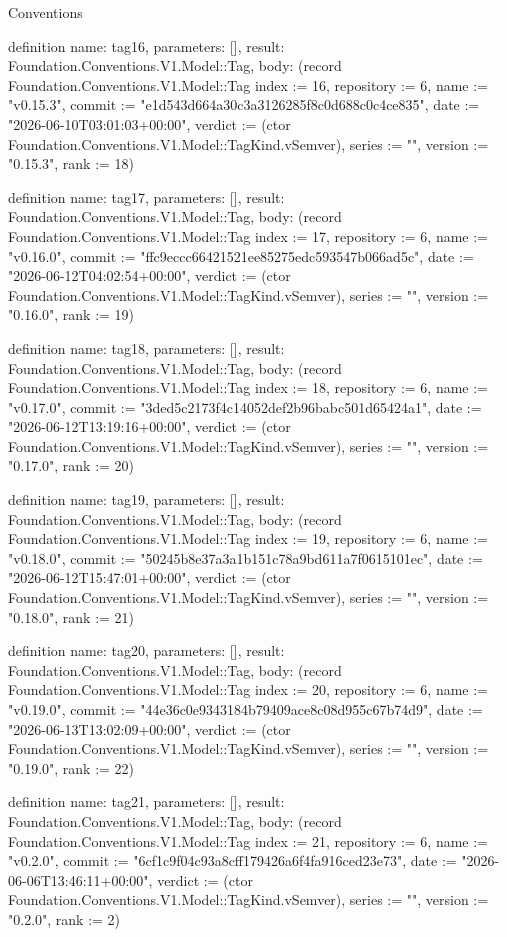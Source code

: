 \begin{lexlean}{Conventions}
\begin{semanticmodule}
definition{
  name: tag16,
  parameters: [],
  result: Foundation.Conventions.V1.Model::Tag,
  body: (record Foundation.Conventions.V1.Model::Tag {index := 16, repository := 6, name := "v0.15.3", commit := "e1d543d664a30c3a3126285f8c0d688c0c4ce835", date := "2026-06-10T03:01:03+00:00", verdict := (ctor Foundation.Conventions.V1.Model::TagKind.vSemver), series := "", version := "0.15.3", rank := 18})
}

definition{
  name: tag17,
  parameters: [],
  result: Foundation.Conventions.V1.Model::Tag,
  body: (record Foundation.Conventions.V1.Model::Tag {index := 17, repository := 6, name := "v0.16.0", commit := "ffc9eccc66421521ee85275edc593547b066ad5c", date := "2026-06-12T04:02:54+00:00", verdict := (ctor Foundation.Conventions.V1.Model::TagKind.vSemver), series := "", version := "0.16.0", rank := 19})
}

definition{
  name: tag18,
  parameters: [],
  result: Foundation.Conventions.V1.Model::Tag,
  body: (record Foundation.Conventions.V1.Model::Tag {index := 18, repository := 6, name := "v0.17.0", commit := "3ded5c2173f4c14052def2b96babc501d65424a1", date := "2026-06-12T13:19:16+00:00", verdict := (ctor Foundation.Conventions.V1.Model::TagKind.vSemver), series := "", version := "0.17.0", rank := 20})
}

definition{
  name: tag19,
  parameters: [],
  result: Foundation.Conventions.V1.Model::Tag,
  body: (record Foundation.Conventions.V1.Model::Tag {index := 19, repository := 6, name := "v0.18.0", commit := "50245b8e37a3a1b151c78a9bd611a7f0615101ec", date := "2026-06-12T15:47:01+00:00", verdict := (ctor Foundation.Conventions.V1.Model::TagKind.vSemver), series := "", version := "0.18.0", rank := 21})
}

definition{
  name: tag20,
  parameters: [],
  result: Foundation.Conventions.V1.Model::Tag,
  body: (record Foundation.Conventions.V1.Model::Tag {index := 20, repository := 6, name := "v0.19.0", commit := "44e36c0e9343184b79409ace8c08d955c67b74d9", date := "2026-06-13T13:02:09+00:00", verdict := (ctor Foundation.Conventions.V1.Model::TagKind.vSemver), series := "", version := "0.19.0", rank := 22})
}

definition{
  name: tag21,
  parameters: [],
  result: Foundation.Conventions.V1.Model::Tag,
  body: (record Foundation.Conventions.V1.Model::Tag {index := 21, repository := 6, name := "v0.2.0", commit := "6cf1c9f04c93a8cff179426a6f4fa916ced23e73", date := "2026-06-06T13:46:11+00:00", verdict := (ctor Foundation.Conventions.V1.Model::TagKind.vSemver), series := "", version := "0.2.0", rank := 2})
}


\end{semanticmodule}
\end{lexlean}
